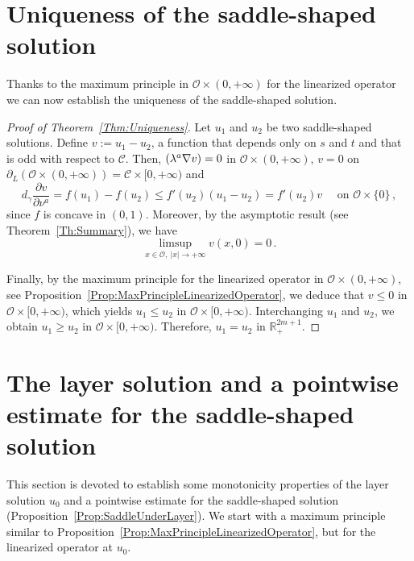 \documentclass[12pt,reqno]{amsart}
\theoremstyle{definition}
\theoremstyle{remark}
\newcommand{\con}[1]{\mathbb{#1}}
\newcommand{\R}{\con{R}} %
\newcommand{\ccal}{\mathscr{C}}
\newcommand{\ocal}{\mathcal{O}}
\newcommand{\s}{\gamma}
\let\div\relax
\DeclareMathOperator{\div}{div}
\numberwithin{equation}{section}
\begin{document}
\section{Uniqueness of the saddle-shaped solution}
\label{Sec:Uniqueness}
Thanks to the maximum principle in $\ocal\times (0,+\infty)$ for the linearized operator we can now establish the uniqueness of the saddle-shaped solution.

\begin{proof}[Proof of Theorem~\ref{Thm:Uniqueness}]
	Let $u_1$ and $u_2$ be two saddle-shaped solutions. Define $v := u_1 - u_2$, a function that depends only on $s$ and $t$ and that is odd with respect to $\ccal$. Then, $\div(\lambda^a \nabla v) = 0$ in $\ocal \times (0,+\infty)$, $v=0$ on $\partial_L \left( \ocal \times (0,+\infty) \right) = \ccal \times [0,+\infty)$ and
	$$
	d_\s \dfrac{\partial v}{\partial \nu^a} = f(u_1) - f(u_2) \leq f'(u_2) (u_1 - u_2) = f'(u_2) v \quad \textrm{ on } \ocal \times \{0\}\,,
	$$
	since $f$ is concave in $(0,1)$. Moreover, by the asymptotic result (see Theorem~\ref{Th:Summary}), we have
	$$
	\limsup_{x \in \ocal,\ |x|\to +\infty} v(x, 0) = 0\,.
	$$
	
	Finally, by the maximum principle for the linearized operator in $\ocal\times (0,+\infty)$, see Proposition~\ref{Prop:MaxPrincipleLinearizedOperator}, we deduce that $v \leq 0$ in $\ocal \times [0, +\infty)$, which yields $u_1 \leq u_2$ in $\ocal \times [0, +\infty)$. Interchanging $u_1$ and $u_2$, we obtain $u_1 \geq u_2$ in $\ocal \times [0, +\infty)$. Therefore, $u_1 = u_2$ in $\R^{2m+1}_+$.
\end{proof}


\section{The layer solution and a pointwise estimate for the saddle-shaped solution}
\label{Sec:Layer}

This section is devoted to establish some monotonicity properties of the layer solution $u_0$ and a pointwise estimate for the saddle-shaped solution (Proposition~\ref{Prop:SaddleUnderLayer}). We start with a maximum principle similar to Proposition~\ref{Prop:MaxPrincipleLinearizedOperator}, but for the linearized operator at $u_0$.
\end{document}
